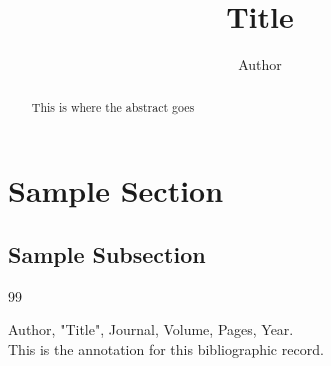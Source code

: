 \documentclass[10pt]{article}
\begin{document}
\title{Title}
\author{Author}

\maketitle

\begin{abstract}

This is where the abstract goes

\end{abstract}

\pagebreak

\section{Sample Section}



\subsection{Sample Subsection}


\begin{thebibliography}{99}

 Author, "Title",  Journal, Volume, Pages, Year. \\
This is the annotation for this bibliographic record.

\end{thebibliography}
\end{document}
